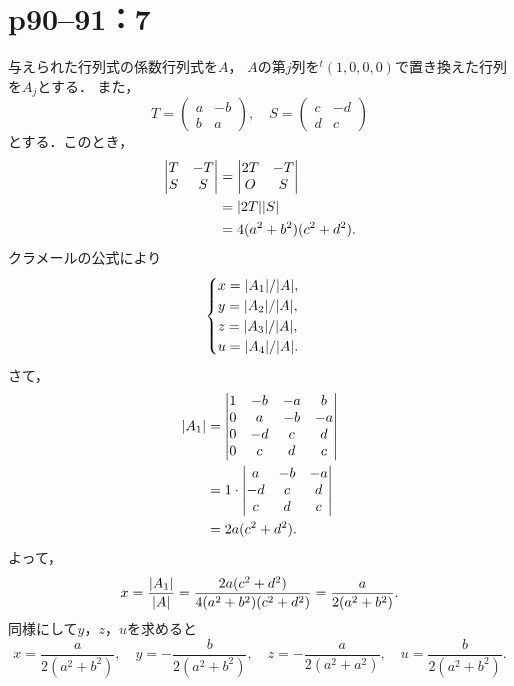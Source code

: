 \documentclass[a4paper,10pt,fleqn]{ltjsarticle}
\begin{document}
\newpage

\section*{p90--91：7}


\begin{tleftbar}
  与えられた行列式の係数行列式を$A$， $A$の第$j$列を${}^t (1, 0, 0 ,0 )$で置き換えた行列を$A_j$とする．
  また，
  \[
    T = \begin{pmatrix} a & -b\\ b & a \end{pmatrix},\quad S = \begin{pmatrix} c & -d\\ d & c \end{pmatrix}
  \]
  とする．このとき，
  \begin{align*}
    \begin{vmatrix} T & -T \\  S & S \end{vmatrix} & = \begin{vmatrix} 2T & - T \\ O & S \end{vmatrix} \\
                                                   & = \abs{2T} \abs{S}                                \\
                                                   & = 4(a^2+b^2) (c^2+d^2).
  \end{align*}
  クラメールの公式により
  \[
    \begin{cases}
      x  = \abs{A_1}/\abs{A}, \\
      y = \abs{A_2}/\abs{A},  \\
      z = \abs{A_3}/\abs{A},  \\
      u = \abs{A_4}/\abs{A}.
    \end{cases}
  \]
  さて，
  \begin{align*}
    \abs{A_1} & = \begin{vmatrix} 1 & -b & -a & b \\ 0 & a & -b & -a \\ 0 & -d & c & d \\ 0 & c & d & c \end{vmatrix} \\
              & = 1 \cdot \begin{vmatrix} a & -b & -a \\ -d & c & d \\ c & d & c \end{vmatrix}                        \\
              & = 2a(c^2+d^2).
  \end{align*}
  よって，
  \[
    x = \frac{\abs{A_1}}{\abs{A}} = \frac{2a(c^2+d^2)}{4(a^2+b^2)(c^2+d^2)} = \frac{a}{2(a^2+b^2)}.
  \]
  同様にして$y$，$z$，$u$を求めると
  \[
    x= \frac{a}{2(a^2+b^2)},\quad y = -\frac{b}{2(a^2+b^2)},\quad z = -\frac{a}{2(a^2+a^2)},\quad u = \frac{b}{2(a^2+b^2)}.
  \]
\end{tleftbar}
\end{document}
